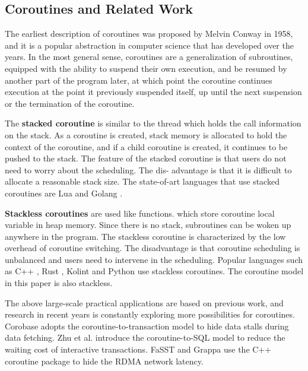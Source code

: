 \documentclass[10pt]{article}
\begin{document}
\subsection{Coroutines and Related Work}

The earliest description of coroutines was proposed by Melvin Conway \cite{conway1963design} in 1958, and it is a popular abstraction in computer science that has developed over the years. In the most general sense, coroutines \cite{waern2021coroutines, moura2009revisiting} are a generalization of subroutines, equipped with the ability to suspend their own execution, and be resumed by another part of the program later, at which point the coroutine continues execution at the point it previously suspended itself, up until the next suspension or the termination of the coroutine.

The \textbf{stacked coroutine} \cite{WANG2022102980} is similar to the thread which holds the call information on the stack. As a coroutine is created, stack memory is allocated to hold the context of the coroutine, and if a child coroutine is created, it continues to be pushed to the stack. The feature of the stacked coroutine is that users do not need to worry about the scheduling. The dis- advantage is that it is difficult to allocate a reasonable stack size. The state-of-art languages that use stacked coroutines are Lua \cite{de2004coroutines} and Golang \cite{prabhakar2011concurrent}.

\textbf{Stackless coroutines} are used like functions. which store coroutine local variable in heap memory. Since there is no stack, subroutines can be woken up anywhere in the program. The stackless coroutine is characterized by the low overhead of coroutine switching. The disadvantage is that coroutine scheduling is unbalanced and users need to intervene in the scheduling. Popular languages such as C++ \cite{8995550}, Rust \cite{weber2020process}, Kolint \cite{elizarov2021kotlin} and Python \cite{tismer2000continuations} use stackless coroutines. The coroutine model in this paper is also stackless.

The above large-scale practical applications are based on previous work, and research in recent years is constantly exploring more possibilities for coroutines. Corobase \cite{he2020corobase} adopts the coroutine-to-transaction model to hide data stalls during data fetching. Zhu et al. \cite{zhu2018interactive} introduce the coroutine-to-SQL model to reduce the waiting cost of interactive transactions. FaSST \cite{kalia2016fasst} and Grappa \cite{nelson2015latency} use the C++ coroutine package to hide the RDMA network latency.
\end{document}
